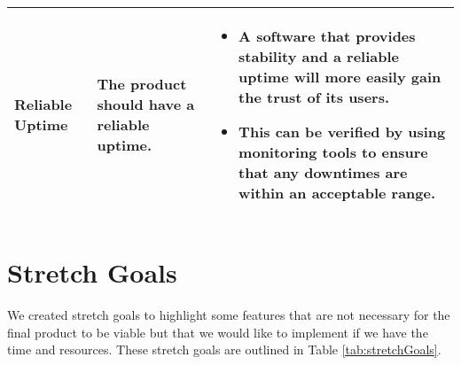 \documentclass{article}
\begin{document}
\begin{center}
\begin{longtable}{ | p{3cm} | p{4cm} | p{4.5cm} |}
    Reliable Uptime & 
    The product should have a reliable uptime.  &  
    \begin{itemize}[noitemsep,nolistsep,leftmargin=*]
        \item A software that provides stability and a reliable uptime will more easily gain the trust of its users.
        \item This can be verified by using monitoring tools to ensure that any downtimes are within an acceptable range.
    \end{itemize}
    \\ \hline
    \end{longtable}
\end{center}

\section{Stretch Goals}

We created stretch goals to highlight some features that are not necessary for the final product to be viable but that we would like to implement if we have the time and resources. These stretch goals are outlined in Table \ref{tab:stretchGoals}.
\end{document}
